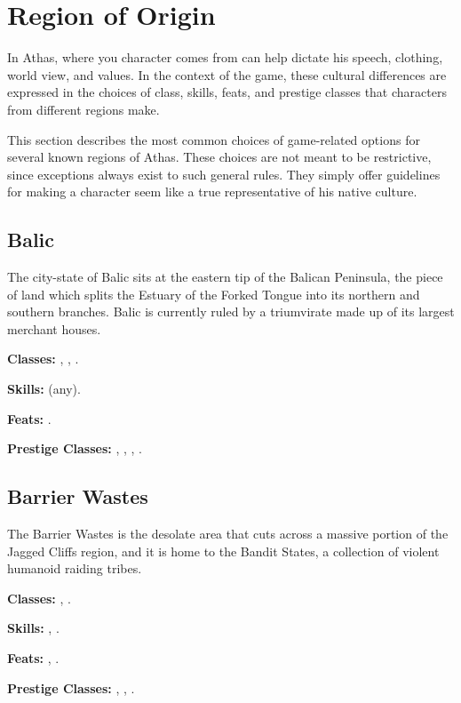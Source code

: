 \section{Region of Origin}

In Athas, where you character comes from can help dictate his speech, clothing, world view, and values. In the context of the game, these cultural differences are expressed in the choices of class, skills, feats, and prestige classes that characters from different regions make.

This section describes the most common choices of game-related options for several known regions of Athas. These choices are not meant to be restrictive, since exceptions always exist to such general rules. They simply offer guidelines for making a character seem like a true representative of his native culture.

\subsection{Balic}
The city-state of Balic sits at the eastern tip of the Balican Peninsula, the piece of land which splits the Estuary of the Forked Tongue into its northern and southern branches. Balic is currently ruled by a triumvirate made up of its largest merchant houses.

\textbf{Classes:} , , .

\textbf{Skills:}  (any).

\textbf{Feats:} .

\textbf{Prestige Classes:} , , , .

\subsection{Barrier Wastes}
The Barrier Wastes is the desolate area that cuts across a massive portion of the Jagged Cliffs region, and it is home to the Bandit States, a collection of violent humanoid raiding tribes.

\textbf{Classes:} , .

\textbf{Skills:} , .

\textbf{Feats:} , .

\textbf{Prestige Classes:} , , .

